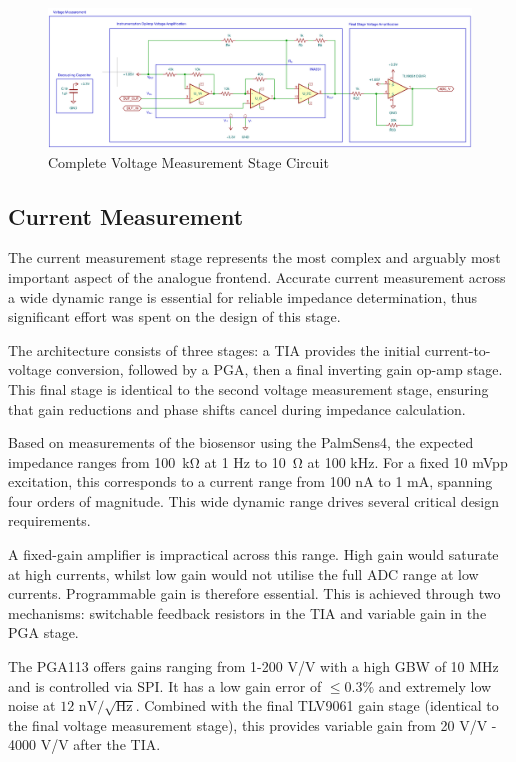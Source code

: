 \begin{figure}[H]
    \centering
    \includegraphics[width=\textwidth]{VMeasSchem.png}
    \caption{Complete Voltage Measurement Stage Circuit}
    \label{fig:vmeas_stage_circuit}
\end{figure}


\subsection{Current Measurement}\label{subsec:design_cur}
The current measurement stage represents the most complex and arguably most important aspect of the analogue frontend. Accurate current measurement across a wide dynamic range is essential for reliable impedance determination, thus significant effort was spent on the design of this stage.

The architecture consists of three stages: a \ac{TIA} provides the initial current-to-voltage conversion, followed by a \ac{PGA}, then a final inverting gain op-amp stage. This final stage is identical to the second voltage measurement stage, ensuring that gain reductions and phase shifts cancel during impedance calculation.

Based on measurements of the biosensor using the PalmSens4, the expected impedance ranges from \SI{100}{\kilo\ohm} at 1 Hz to \SI{10}{\ohm} at 100 kHz. For a fixed 10 mVpp excitation, this corresponds to a current range from 100 nA to 1 mA, spanning four orders of magnitude. This wide dynamic range drives several critical design requirements.

A fixed-gain amplifier is impractical across this range. High gain would saturate at high currents, whilst low gain would not utilise the full \ac{ADC} range at low currents. Programmable gain is therefore essential. This is achieved through two mechanisms: switchable feedback resistors in the \ac{TIA} and variable gain in the \ac{PGA} stage.

The PGA113 offers gains ranging from 1-200 V/V with a high GBW of 10 MHz and is controlled via SPI. It has a low gain error of $\le0.3\%$ and extremely low noise at $12\text{ nV}/\sqrt{\text{Hz}}$. Combined with the final TLV9061 gain stage (identical to the final voltage measurement stage), this provides variable gain from 20 V/V - 4000 V/V after the \ac{TIA}. 


